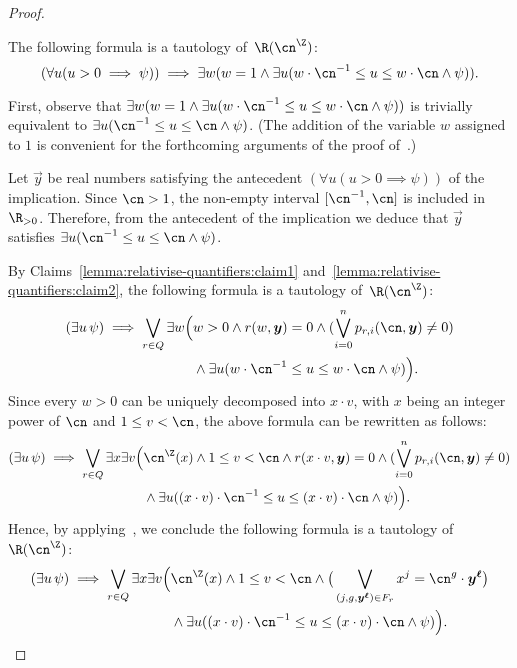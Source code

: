 \begin{proof}
    \begin{claim}\label{lemma:relativise-quantifiers:claim2}
      The following formula is a tautology of~$\R(\ipow{\cn})$:
      \[
        (\forall u (u > 0 \implies \psi)) 
        \implies 
        \exists w (w = 1 \land \exists u (w \cdot \cn^{-1} \leq u \leq w \cdot \cn \land \psi)).
      \]
    \end{claim}
    \begin{claimproof}
      First, observe that $\exists w (w = 1 \land \exists u (w \cdot \cn^{-1}
      \leq u \leq w \cdot \cn \land \psi))$ is trivially equivalent to $\exists
      u ( \cn^{-1} \leq u \leq \cn \land \psi)$. (The addition of the variable
      $w$ assigned to $1$ is convenient for the forthcoming arguments of the
      proof of~.)
  
      Let $\vec y$ be real numbers satisfying the antecedent $(\forall u (u > 0
      \implies \psi))$ of the implication. Since $\cn > 1$, the non-empty
      interval $[\cn^{-1},\cn]$ is included in $\R_{>0}$. Therefore, from the
      antecedent of the implication we deduce that $\vec y$ satisfies $\exists u
      ( \cn^{-1} \leq u \leq \cn \land \psi)$.
    \end{claimproof}
    By Claims~\ref{lemma:relativise-quantifiers:claim1}
    and~\ref{lemma:relativise-quantifiers:claim2}, the following formula is a
    tautology of~$\R(\ipow{\cn})$: 
    \begin{align*}
      (\exists u\, \psi)
      \implies 
      \bigvee_{r \in Q}
      \exists w \Big(& w > 0 \land r(w,\vec y) = 0 \land (\bigvee_{i=0}^n p_{r,i}(\cn,\vec y) \neq 0)\\ 
      &{} \land \exists u (w \cdot \cn^{-1} \leq u \leq w \cdot \cn \land \psi) \Big).
    \end{align*}
    Since every $w > 0$ can be uniquely decomposed into $x\cdot v$, with
    $x$ being an integer power of $\cn$ and $1 \leq v < \cn$, the above formula
    can be rewritten as follows:
    \begin{align*}
      (\exists u\, \psi)
      \implies 
      \bigvee_{r \in Q}
      \exists x \exists v \Big(& \ipow{\cn}(x) \land 1 \leq v < \cn \land r(x \cdot v,\vec y) = 0 \land (\bigvee_{i=0}^n p_{r,i}(\cn,\vec y) \neq 0)\\ 
      &{} \land \exists u ( (x \cdot v) \cdot \cn^{-1} \leq u \leq (x \cdot v) \cdot \cn \land \psi) \Big).
    \end{align*}
    Hence, by applying~, we conclude the following
    formula is a tautology of $\R(\ipow{\cn})$: 
    \begin{align}
      (\exists u\, \psi)
      \implies 
      \bigvee_{r \in Q}
      \exists x \exists v \Big(& \ipow{\cn}(x) \land 1 \leq v < \cn \land 
      \big(\bigvee_{(j,g,\vec y^{\vec \ell}) \in F_r}
        x^{j} = \cn^{g} \cdot \vec y^{\vec \ell}      
      \big)
      \notag\\ 
      &{} \land \exists u ( (x \cdot v) \cdot \cn^{-1} \leq u \leq (x \cdot v) \cdot \cn \land \psi) \Big).
      \label{lemma:relativise-quantifiers:eq1}
    \end{align}
  

\end{proof}
